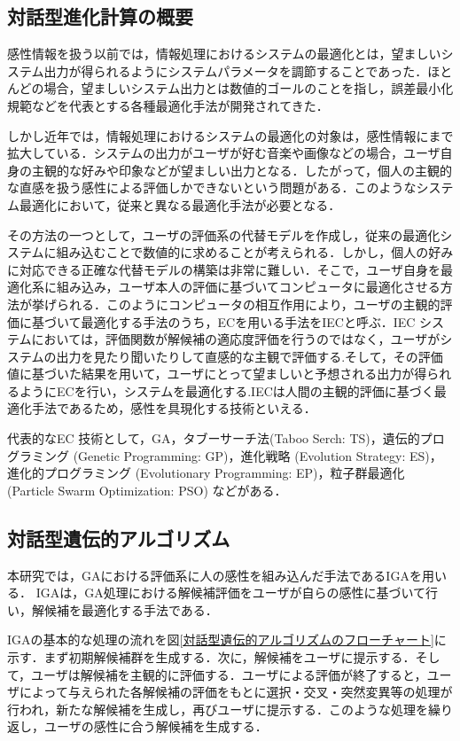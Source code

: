 \subsection{対話型進化計算の概要}
\label{sec2.2.1}

感性情報を扱う以前では，情報処理におけるシステムの最適化とは，望ましいシステム出力が得られるようにシステムパラメータを調節することであった．ほとんどの場合，望ましいシステム出力とは数値的ゴールのことを指し，誤差最小化規範などを代表とする各種最適化手法が開発されてきた\cite{GA2}．

しかし近年では，情報処理におけるシステムの最適化の対象は，感性情報にまで拡大している．システムの出力がユーザが好む音楽や画像などの場合，ユーザ自身の主観的な好みや印象などが望ましい出力となる．したがって，個人の主観的な直感を扱う感性による評価しかできないという問題がある．このようなシステム最適化において，従来と異なる最適化手法が必要となる．

その方法の一つとして，ユーザの評価系の代替モデルを作成し，従来の最適化システムに組み込むことで数値的に求めることが考えられる．しかし，個人の好みに対応できる正確な代替モデルの構築は非常に難しい．そこで，ユーザ自身を最適化系に組み込み，ユーザ本人の評価に基づいてコンピュータに最適化させる方法が挙げられる．このようにコンピュータの相互作用により，ユーザの主観的評価に基づいて最適化する手法のうち，ECを用いる手法をIECと呼ぶ\cite{IEC}．IEC システムにおいては，評価関数が解候補の適応度評価を行うのではなく，ユーザがシステムの出力を見たり聞いたりして直感的な主観で評価する.そして，その評価値に基づいた結果を用いて，ユーザにとって望ましいと予想される出力が得られるようにECを行い，システムを最適化する.IECは人間の主観的評価に基づく最適化手法であるため，感性を具現化する技術といえる．

代表的なEC 技術として，GA，タブーサーチ法(Taboo Serch: TS)，遺伝的プログラミング (Genetic Programming: GP)，進化戦略 (Evolution Strategy: ES)，進化的プログラミング (Evolutionary Programming: EP)，粒子群最適化 (Particle Swarm Optimization: PSO) などがある．
    
\subsection{対話型遺伝的アルゴリズム}
\label{sec2.2.2}

本研究では，GAにおける評価系に人の感性を組み込んだ手法であるIGAを用いる．
IGAは，GA処理における解候補評価をユーザが自らの感性に基づいて行い，解候補を最適化する手法である．

IGAの基本的な処理の流れを図\ref{対話型遺伝的アルゴリズムのフローチャート}に示す．まず初期解候補群を生成する．次に，解候補をユーザに提示する．そして，ユーザは解候補を主観的に評価する．ユーザによる評価が終了すると，ユーザによって与えられた各解候補の評価をもとに選択・交叉・突然変異等の処理が行われ，新たな解候補を生成し，再びユーザに提示する．このような処理を繰り返し，ユーザの感性に合う解候補を生成する．

